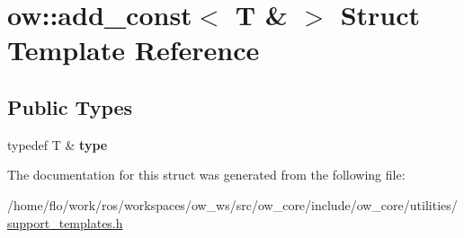 \hypertarget{structow_1_1add__const_3_01T_01_6_01_4}{}\section{ow\+:\+:add\+\_\+const$<$ T \& $>$ Struct Template Reference}
\label{structow_1_1add__const_3_01T_01_6_01_4}
\subsection*{Public Types}
\begin{DoxyCompactItemize}
\item 
typedef T \& {\bfseries type}\hypertarget{structow_1_1add__const_3_01T_01_6_01_4_a797c71b4ed6659a0c3d9669d051900e5}{}\label{structow_1_1add__const_3_01T_01_6_01_4_a797c71b4ed6659a0c3d9669d051900e5}

\end{DoxyCompactItemize}


The documentation for this struct was generated from the following file\+:\begin{DoxyCompactItemize}
\item 
/home/flo/work/ros/workspaces/ow\+\_\+ws/src/ow\+\_\+core/include/ow\+\_\+core/utilities/\hyperlink{support__templates_8h}{support\+\_\+templates.\+h}\end{DoxyCompactItemize}
